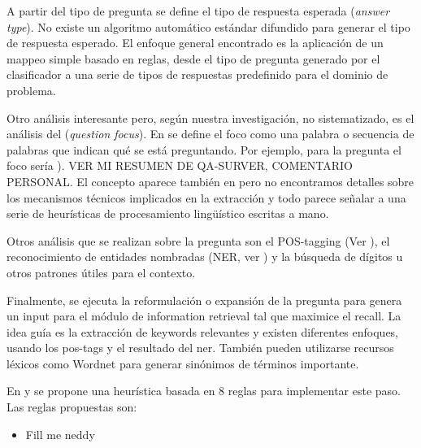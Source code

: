 A partir del tipo de pregunta se define el tipo de respuesta esperada (\textit{answer type}). No existe un algoritmo automático estándar difundido para generar el tipo de respuesta esperado. El enfoque general encontrado es la aplicación de un mappeo simple basado en reglas, desde el tipo de pregunta generado por el clasificador a una serie de tipos de respuestas predefinido para el dominio de problema.

Otro análisis interesante pero, según nuestra investigación, no sistematizado, es el análisis del  (\textit{question focus}). En \cite{QA3} se define el foco como una palabra o secuencia de palabras que indican qué se está preguntando. Por ejemplo, para la pregunta  el foco sería ). {\color{red} VER MI RESUMEN DE QA-SURVER, COMENTARIO PERSONAL}. El concepto aparece también en \cite{WATSON1} pero no encontramos detalles sobre los mecanismos técnicos implicados en la extracción y todo parece señalar a una serie de heurísticas de procesamiento lingüístico escritas a mano. 

Otros análisis que se realizan sobre la pregunta son el POS-tagging (Ver ), el reconocimiento de entidades nombradas (NER, ver ) y la búsqueda de dígitos u otros patrones útiles para el contexto. 

Finalmente, se ejecuta la reformulación o expansión de la pregunta para genera un input para el módulo de information retrieval tal que maximice el recall. 
La idea guía es la extracción de keywords relevantes y existen diferentes enfoques, usando los pos-tags y el resultado del ner. También pueden utilizarse recursos léxicos como Wordnet para generar sinónimos de términos importante. 

En \cite{QA1} y \cite{QA3} se propone una heurística basada en 8 reglas para implementar este paso. Las reglas propuestas son:

\begin{itemize}
\item {\color{red} Fill me neddy}
\end{itemize}

